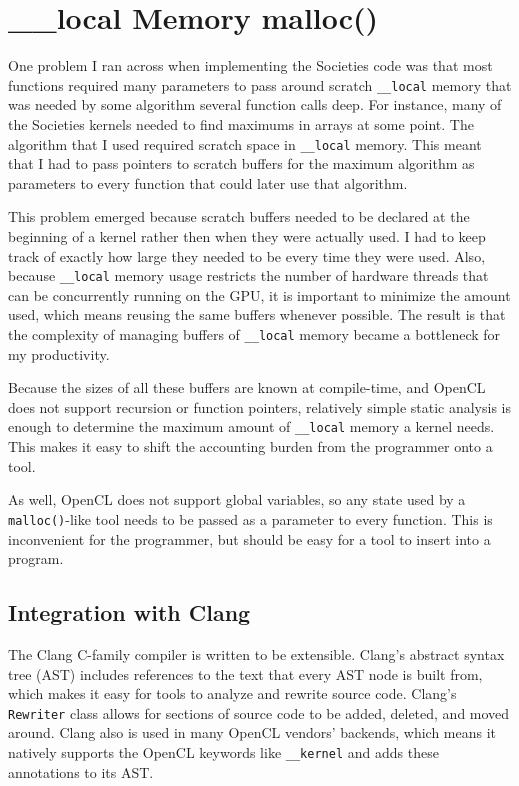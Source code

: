 \documentclass{article}
\begin{document}
\section{\_\_local Memory malloc()}
One problem I ran across when implementing the Societies code was that most functions required many parameters to pass around scratch \texttt{\_\_local} memory that was needed by some algorithm several function calls deep. For instance, many of the Societies kernels needed to find maximums in arrays at some point. The algorithm that I used required scratch space in \texttt{\_\_local} memory. This meant that I had to pass pointers to scratch buffers for the maximum algorithm as parameters to every function that could later use that algorithm.

This problem emerged because scratch buffers needed to be declared at the beginning of a kernel rather then when they were actually used. I had to keep track of exactly how large they needed to be every time they were used. Also, because \texttt{\_\_local} memory usage restricts the number of hardware threads that can be concurrently running on the GPU, it is important to minimize the amount used, which means reusing the same buffers whenever possible. The result is that the complexity of managing buffers of \texttt{\_\_local} memory became a bottleneck for my productivity.

Because the sizes of all these buffers are known at compile-time, and OpenCL does not support recursion or function pointers, relatively simple static analysis is enough to determine the maximum amount of \texttt{\_\_local} memory a kernel needs. This makes it easy to shift the accounting burden from the programmer onto a tool.

As well, OpenCL does not support global variables, so any state used by a \texttt{malloc()}-like tool needs to be passed as a parameter to every function. This is inconvenient for the programmer, but should be easy for a tool to insert into a program.

\subsection{Integration with Clang}
The Clang C-family compiler \cite{clang} is written to be extensible. Clang's abstract syntax tree (AST) includes references to the text that every AST node is built from, which makes it easy for tools to analyze and rewrite source code. Clang's \texttt{Rewriter} class allows for sections of source code to be added, deleted, and moved around. Clang also is used in many OpenCL vendors' backends, which means it natively supports the OpenCL keywords like \texttt{\_\_kernel} and adds these annotations to its AST.
\end{document}
